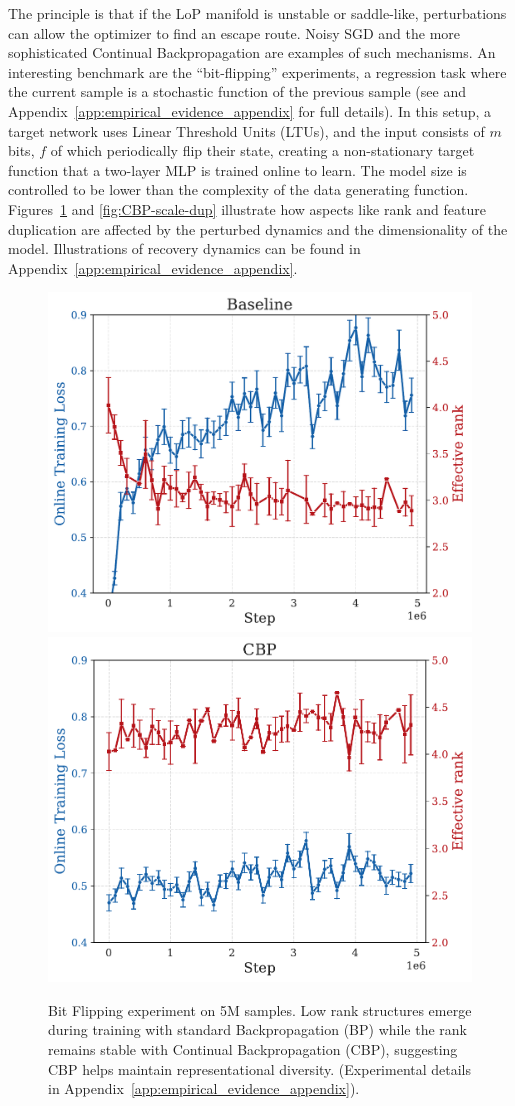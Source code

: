 \documentclass{article}
\numberwithin{figure}{section}
\begin{document}
The principle is that if the LoP manifold is unstable or saddle-like, perturbations can allow the optimizer to find an escape route. Noisy SGD and the more sophisticated Continual Backpropagation \citep{dohare2024loss} are examples of such mechanisms. An interesting benchmark are the ``bit-flipping'' experiments, a regression task where the current sample is a stochastic function of the previous sample (see \citep{dohare2024loss} and Appendix~\ref{app:empirical_evidence_appendix} for full details). In this setup, a target network uses Linear Threshold Units (LTUs), and the input consists of $m$ bits, $f$ of which periodically flip their state, creating a non-stationary target function that a two-layer MLP is trained online to learn. The model size is controlled to be lower than the complexity of the data generating function. Figures~\ref{fig:CBP-scale-rank} and \ref{fig:CBP-scale-dup} illustrate how aspects like rank and feature duplication are affected by the perturbed dynamics and the dimensionality of the model.    Illustrations of recovery dynamics can be found in Appendix~\ref{app:empirical_evidence_appendix}.
\begin{figure}[!ht]
    \centering
    \includegraphics[width=0.33\linewidth]{paper/images/bf_Baseline_rankloss_plot.pdf}
    \includegraphics[width=0.33\linewidth]{paper/images/bf_CBP_rankloss_plot.pdf}
        \vspace{-.3cm}
    \caption{Bit Flipping experiment on 5M samples. Low rank structures emerge during training with standard Backpropagation (BP) while the rank remains stable with Continual Backpropagation (CBP), suggesting CBP helps maintain representational diversity. (Experimental details in Appendix~\ref{app:empirical_evidence_appendix}).}
    \label{fig:CBP-scale-rank}
\end{figure}
\end{document}
